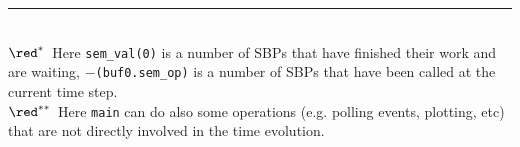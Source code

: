 \documentclass[12pt]{article}
\begin{document}
\vfill
\rule{80pt}{0.5pt}\\
$\red^*$~Here {\blue\tt sem\_val(0)} is a number of SBPs that have finished
their work and are waiting, {\blue\tt $-$(buf0.sem\_op)} is a number of SBPs
that have been called at the current time step.\\
$\red^{**}$~Here {\blue\tt main} can do also some operations (e.g. polling
events, plotting, etc) that are not directly involved in the time evolution.\\
\end{document}
